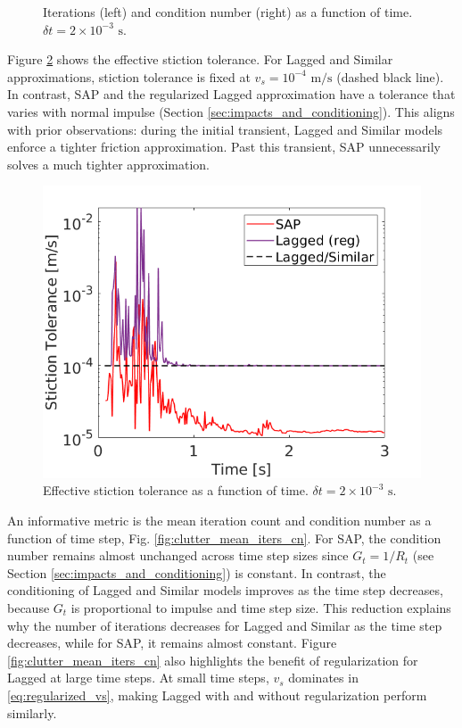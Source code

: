 \begin{figure}[!h]
    \centering
    \caption{\label{fig:clutter_iters_cn} Iterations (left) and condition number
    (right) as a function of time. $\delta t=2\times10^{-3}\text{ s}$.}
\end{figure}

Figure \ref{fig:clutter_stiction_tolerance} shows the effective stiction
tolerance. For Lagged and Similar approximations, stiction tolerance is fixed at
$v_s=10^{-4}\text{ m}/\text{s}$ (dashed black line). In contrast, SAP and the
regularized Lagged approximation have a tolerance that varies with normal impulse
(Section \ref{sec:impacts_and_conditioning}). This aligns with prior
observations: during the initial transient, Lagged and Similar models enforce a
tighter friction approximation. Past this transient, SAP unnecessarily solves a
much tighter approximation.

\begin{figure}[!h]
    \centering
    \includegraphics[width=0.8\columnwidth]{figures/TestCases/Clutter/SteelStiff/stiction_tolerance_dt2em3.png}
    \caption{Effective stiction tolerance as a function of time. $\delta t=2\times10^{-3}\text{ s}$.}
    \label{fig:clutter_stiction_tolerance}
\end{figure}

An informative metric is the mean iteration count and condition number as a
function of time step, Fig. \ref{fig:clutter_mean_iters_cn}. For SAP,
the condition number remains almost unchanged across time step sizes since
$G_t=1/R_t$ (see Section \ref{sec:impacts_and_conditioning}) is constant. In contrast,
the conditioning of Lagged and Similar models improves as the time step decreases,
because $G_t$ is proportional to impulse and time step size. This reduction explains
why the number of iterations decreases for Lagged and Similar as the time step
decreases, while for SAP, it remains almost constant. Figure
\ref{fig:clutter_mean_iters_cn} also highlights the benefit of regularization
for Lagged at large time steps. At small time steps, $v_s$ dominates in
\eqref{eq:regularized_vs}, making Lagged with and without regularization perform
similarly.


